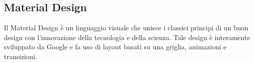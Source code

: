 	\subsection{Material Design}
	Il Material Design è un linguaggio visuale che unisce i classici principi di
	un buon design con l'innovazione della tecnologia e della scienza. 
	\cite{material} \newline
	Tale design è interamente sviluppato da Google e fa uso di layout basati su
	una griglia, animazioni e transizioni. 
	
